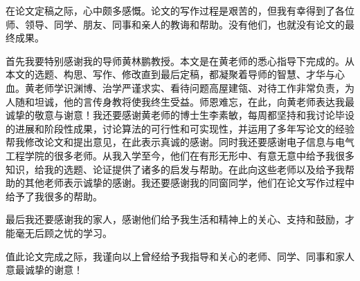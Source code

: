
\begin{thanks}

在论文定稿之际，心中颇多感慨。论文的写作过程是艰苦的，但我有幸得到了各位师、领导、同学、朋友、同事和亲人的教诲和帮助。没有他们，也就没有论文的最终成果。

首先我要特别感谢我的导师黄林鹏教授。本文是在黄老师的悉心指导下完成的。从本文的选题、构思、写作、修改直到最后定稿，都凝聚着导师的智慧、才华与心血。黄老师学识渊博、治学严谨求实、看待问题高屋建瓴、对待工作非常负责，为人随和坦诚，他的言传身教将使我终生受益。师恩难忘，在此，向黄老师表达我最诚挚的敬意与谢意！我还要感谢黄老师的博士生李素敏，每周都坚持和我讨论毕设的进展和阶段性成果，讨论算法的可行性和可实现性，并运用了多年写论文的经验帮我修改论文和提出意见，在此表示真诚的感谢。同时我还要感谢电子信息与电气工程学院的很多老师。从我入学至今，他们在有形无形中、有意无意中给予我很多知识，给我的选题、论证提供了诸多的启发与帮助。在此向这些老师以及给予我帮助的其他老师表示诚挚的感谢。我还要感谢我的同窗同学，他们在论文写作过程中给予了我很多的帮助。

最后我还要感谢我的家人，感谢他们给予我生活和精神上的关心、支持和鼓励，才能毫无后顾之忧的学习。

值此论文完成之际，我谨向以上曾经给予我指导和关心的老师、同学、同事和家人意最诚挚的谢意！

\end{thanks}
